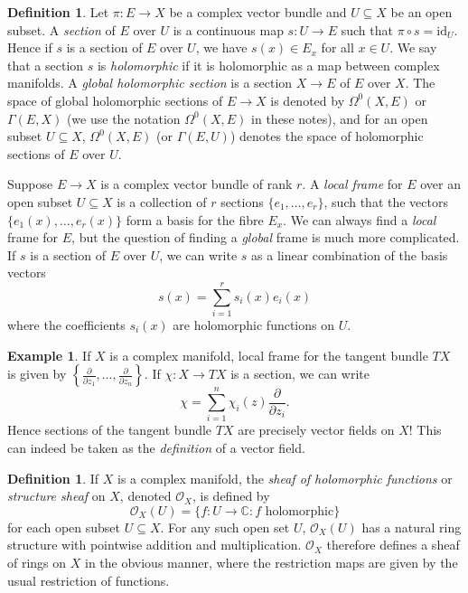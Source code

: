 \documentclass[10pt]{amsart}
\numberwithin{equation}{section}
\def\~#1{\mathscr{#1}}
\newcommand{\C}{\mathbb{C}}
\newcommand{\id}{\mathrm{id}}
\theoremstyle{plain}
\theoremstyle{definition}
\newtheorem{defn}[thm]{Definition}
\newtheorem{ex}[thm]{Example}
\theoremstyle{remark}
\begin{document}
\begin{defn}
Let $\pi: E \to X$ be a complex vector bundle and $U \subseteq X$ be an open subset. A \emph{section} of $E$ over $U$ is a continuous map $s: U \to E$ such that $\pi \circ s = \id_U$. Hence if $s$ is a section of $E$ over $U$, we have $s(x) \in E_x$ for all $x \in U$. We say that a section $s$ is \emph{holomorphic} if it is holomorphic as a map between complex manifolds. A \emph{global holomorphic section} is a section $X \to E$ of $E$ over $X$. The space of global holomorphic sections of $E \to X$ is denoted by $\Omega^0(X, E)$ or $\Gamma(E, X)$ (we use the notation $\Omega^0(X, E)$ in these notes), and for an open subset $U \subseteq X$, $\Omega^0(X, E)$ (or $\Gamma(E, U)$) denotes the space of holomorphic sections of $E$ over $U$.
\end{defn}

Suppose $E \to X$ is a complex vector bundle of rank $r$. A \emph{local frame} for $E$ over an open subset $U \subseteq X$ is a collection of $r$ sections $\{e_1, \hdots, e_r\}$, such that the vectors $\{e_1(x), \hdots, e_r(x)\}$ form a basis for the fibre $E_x$. We can always find a \emph{local} frame for $E$, but the question of finding a \emph{global} frame is much more complicated. If $s$ is a section of $E$ over $U$, we can write $s$ as a linear combination of the basis vectors
\[s(x) = \sum_{i = 1}^r s_i(x) e_i(x)\]
where the coefficients $s_i(x)$ are holomorphic functions on $U$.

\begin{ex}
    If $X$ is a complex manifold, local frame for the tangent bundle $TX$ is given by $\left\{\frac{\partial}{\partial z_1}, \hdots, \frac{\partial}{\partial z_n}\right\}$. If $\chi: X \to TX$ is a section, we can write 
    \[\chi = \sum_{i=1}^n \chi_i(z) \frac{\partial}{\partial z_i}.\]
    Hence sections of the tangent bundle $TX$ are precisely vector fields on $X$! This can indeed be taken as the \emph{definition} of a vector field.
\end{ex}

\begin{defn}
    If $X$ is a complex manifold, the \emph{sheaf of holomorphic functions} or \emph{structure sheaf} on $X$, denoted $\~O_X$, is defined by
    \[\~O_X(U) = \{f: U \to \C : f \text{ holomorphic}\}\] 
    for each open subset $U \subseteq X$. For any such open set $U$, $\~O_X(U)$ has a natural ring structure with pointwise addition and multiplication. $\~O_X$ therefore defines a sheaf of rings on $X$ in the obvious manner, where the restriction maps are given by the usual restriction of functions.
\end{defn}
\end{document}
